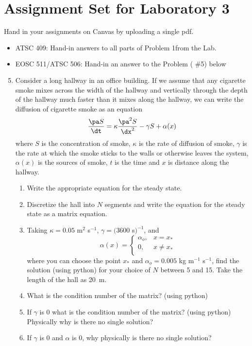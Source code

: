\documentclass[12pt]{article}
\begin{document}
\section*{Assignment Set for Laboratory 3}

Hand in your assignments on Canvas by uploading a single pdf.

\begin{itemize}
\item ATSC 409: Hand-in answers to all parts of Problem 1from the Lab.
  
\item EOSC 511/ATSC 506:  Hand-in an answer to the Problem ( \#5) below
\end{itemize}

\begin{enumerate}
\setcounter{enumi}{4}
\item Consider a long hallway in an office building.  If we assume that any cigarette smoke mixes across the width of the hallway and vertically through the depth of the hallway much faster than it mixes along the hallway, we can write the diffusion of cigarette smoke as an equation
\[
\frac{\pa S}{\dt} = \kappa \frac {\pa^2 S}{\dx^2} - \gamma S + \alpha(x)
\]
where $S$ is the concentration of smoke, $\kappa$ is the rate of diffusion of smoke, $\gamma$ is the rate at which the smoke sticks to the walls or otherwise leaves the system, $\alpha(x)$ is the sources of smoke, $t$ is the time and $x$ is distance along the hallway.
\begin{enumerate}
\item Write the appropriate equation for the steady state.
\item Discretize the hall into $N$ segments and write the equation for the steady state as a matrix equation.
\item Taking $\kappa = 0.05$ m$^2$ s$^{-1}$, $\gamma = (3600$ s$)^{-1}$, and 
\begin{equation}
\alpha(x) = \left\{ \begin{array}{cl}
\alpha_o,& x=x_*\\
0, & x \ne x_*\\
\end{array} \right.
\end{equation}
  where you can choose the point $x_*$ and $\alpha_o = 0.005$ kg m$^{-1}$ s$^{-1}$,  find the solution (using python) for your choice of $N$ between 5 and 15.  Take the length of the hall as 20~m.
\item What is the condition number of the matrix? (using python)
\item If $\gamma$ is 0 what is the condition number of the matrix?  (using python) Physically why is there no single solution?
\item If $\gamma$ is 0 and $\alpha$ is 0, why physically is there no single solution?
\end{enumerate}
\end{enumerate}
\end{document}
